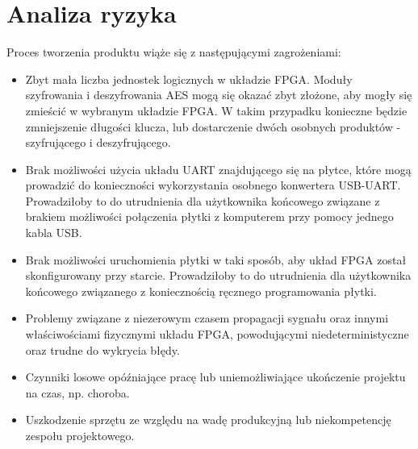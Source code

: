 \section{Analiza ryzyka}
\label{sec:analiza-ryzyka}
Proces tworzenia produktu wiąże się z następującymi zagrożeniami:
\begin{itemize}
\item Zbyt mała liczba jednostek logicznych w układzie FPGA. Moduły szyfrowania i deszyfrowania AES mogą się okazać zbyt złożone, aby mogły się zmieścić w wybranym układzie FPGA. W takim przypadku konieczne będzie zmniejszenie długości klucza, lub dostarczenie dwóch osobnych produktów - szyfrującego i deszyfrującego.
\item Brak możliwości użycia układu UART znajdującego się na płytce, które mogą prowadzić do konieczności wykorzystania osobnego konwertera USB-UART. Prowadziłoby to do utrudnienia dla użytkownika końcowego związane z brakiem możliwości połączenia płytki z komputerem przy pomocy jednego kabla USB.
\item Brak możliwości uruchomienia płytki w taki sposób, aby układ FPGA został skonfigurowany przy starcie. Prowadziłoby to do utrudnienia dla użytkownika końcowego związanego z koniecznością ręcznego programowania płytki.
\item Problemy związane z niezerowym czasem propagacji sygnału oraz innymi właściwościami fizycznymi układu FPGA, powodującymi niedeterministyczne oraz trudne do wykrycia błędy.
\item Czynniki losowe opóźniające pracę lub uniemożliwiające ukończenie projektu na czas, np. choroba.
\item Uszkodzenie sprzętu ze względu na wadę produkcyjną lub niekompetencję zespołu projektowego.
\end{itemize}



\newpage